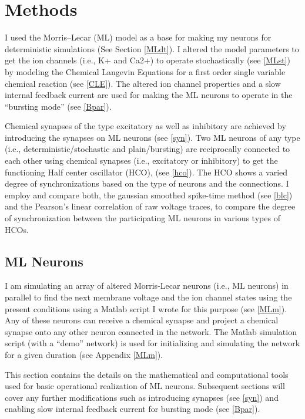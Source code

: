 \documentclass[
]{article}
\begin{document}
\hypertarget{methods}{%
\section{Methods}\label{methods}}

I used the Morris--Lecar (ML) model as a base for making my neurons for deterministic simulations (See Section \ref{MLdt}). I altered the model parameters to get the ion channels (i.e., K+ and Ca2+) to operate stochastically (see \ref{MLst}) by modeling the Chemical Langevin Equations for a first order single variable chemical reaction (see \ref{CLE}). The altered ion channel properties and a slow internal feedback current are used for making the ML neurons to operate in the ``bursting mode'' (see \ref{Bpar}).

Chemical synapses of the type excitatory as well as inhibitory are achieved by introducing the synapses on ML neurons (see \ref{syn}). Two ML neurons of any type (i.e., deterministic/stochastic and plain/bursting) are reciprocally connected to each other using chemical synapses (i.e., excitatory or inhibitory) to get the functioning Half center oscillator (HCO), (see \ref{hco}). The HCO shows a varied degree of synchronizations based on the type of neurons and the connections. I employ and compare both, the gaussian smoothed spike-time method (see \ref{blc}) and the Pearson's linear correlation of raw voltage traces, to compare the degree of synchronization between the participating ML neurons in various types of HCOs.

\hypertarget{ML}{%
\subsection{ML Neurons}\label{ML}}

I am simulating an array of altered Morris-Lecar neurons (i.e., ML neurons) in parallel to find the next membrane voltage and the ion channel states using the present conditions using a Matlab script I wrote for this purpose (see \ref{MLm}). Any of these neurons can receive a chemical synapse and project a chemical synapse onto any other neuron connected in the network. The Matlab simulation script (with a ``demo'' network) is used for initializing and simulating the network for a given duration (see Appendix \ref{MLm}).

This section contains the details on the mathematical and computational tools used for basic operational realization of ML neurons. Subsequent sections will cover any further modifications such as introducing synapses (see \ref{syn}) and enabling slow internal feedback current for bursting mode (see \ref{Bpar}).
\end{document}
